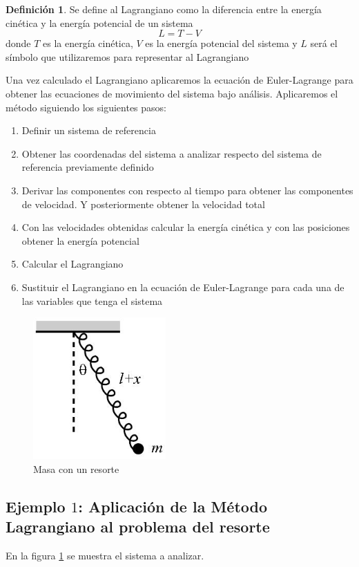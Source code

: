 \documentclass[12pt]{book}
\theoremstyle{definition}
\newtheorem{dfn}{Definición}[section]
\theoremstyle{remark}
\theoremstyle{plain}
\begin{document}
\begin{dfn}
\label{def2}
Se define al Lagrangiano como la diferencia entre la energía cinética y la energía potencial de un sistema
\begin{equation*}
L=T-V
\end{equation*}
donde $T$ es la energía cinética, $V$ es la energía potencial del sistema y $L$ será el símbolo que utilizaremos para representar al Lagrangiano
\end{dfn}

Una vez calculado el Lagrangiano aplicaremos la ecuación de Euler-Lagrange para obtener las ecuaciones de movimiento del sistema bajo análisis. Aplicaremos  el método siguiendo los siguientes pasos:
\begin{enumerate}
\item Definir un sistema de referencia
\item Obtener las coordenadas del sistema a analizar respecto del sistema de referencia previamente definido
\item Derivar las componentes con respecto al tiempo para obtener las componentes de velocidad. Y posteriormente obtener la velocidad total
\item Con las velocidades obtenidas calcular la energía cinética y con las posiciones obtener la energía potencial
\item Calcular el Lagrangiano
\item Sustituir el Lagrangiano en la ecuación de Euler-Lagrange para cada una de las variables que tenga el sistema
\end{enumerate}

\begin{figure}
\centering
\includegraphics[width=2in]{resorte.jpg}
\caption{Masa con un resorte}
\label{fig8}
\end{figure}

\subsection{Ejemplo $1$: Aplicación de la Método Lagrangiano al problema del resorte}
 En la figura \ref{fig8} se muestra el sistema a analizar. 
\end{document}
